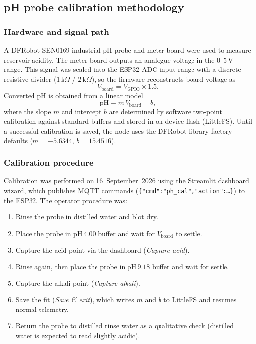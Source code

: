 \subsection*{pH probe calibration methodology}

\subsubsection{Hardware and signal path}
A DFRobot SEN0169 industrial pH probe and meter board were used to measure
reservoir acidity. The meter board outputs an analogue voltage in the
$0$--$5\,\mathrm{V}$ range. This signal was scaled into the ESP32 ADC input
range with a discrete resistive divider ($1\,\mathrm{k}\Omega$ /
$2\,\mathrm{k}\Omega$), so the firmware reconstructs board voltage as
\begin{equation}
  V_{\mathrm{board}} = V_{\mathrm{GPIO}} \times 1.5.
\end{equation}
Converted $\mathrm{pH}$ is obtained from a linear model
\begin{equation}
  \mathrm{pH} = m\,V_{\mathrm{board}} + b,
\end{equation}
where the slope $m$ and intercept $b$ are determined by software two-point
calibration against standard buffers and stored in on-device flash
(LittleFS). Until a successful calibration is saved, the node uses the
DFRobot library factory defaults
($m=-5.6344$, $b=15.4516$).

\subsubsection{Calibration procedure}
Calibration was performed on 16~September~2026 using the Streamlit dashboard
wizard, which publishes MQTT commands
(\texttt{\{"cmd":"ph\_cal","action":\ldots\}}) to the ESP32. The operator
procedure was:
\begin{enumerate}
  \item Rinse the probe in distilled water and blot dry.
  \item Place the probe in $\mathrm{pH}\,4.00$ buffer and wait for
        $V_{\mathrm{board}}$ to settle.
  \item Capture the acid point via the dashboard (\emph{Capture acid}).
  \item Rinse again, then place the probe in $\mathrm{pH}\,9.18$ buffer and
        wait for settle.
  \item Capture the alkali point (\emph{Capture alkali}).
  \item Save the fit (\emph{Save \& exit}), which writes $m$ and $b$ to
        LittleFS and resumes normal telemetry.
  \item Return the probe to distilled rinse water as a qualitative check
        (distilled water is expected to read slightly acidic).
\end{enumerate}

